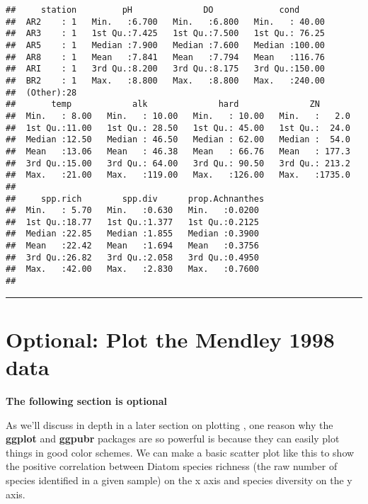 \documentclass[]{book}
\theoremstyle{definition}
\theoremstyle{definition}
\theoremstyle{definition}
\theoremstyle{remark}
\begin{document}
\begin{verbatim}
##     station         pH              DO             cond       
##  AR2    : 1   Min.   :6.700   Min.   :6.800   Min.   : 40.00  
##  AR3    : 1   1st Qu.:7.425   1st Qu.:7.500   1st Qu.: 76.25  
##  AR5    : 1   Median :7.900   Median :7.600   Median :100.00  
##  AR8    : 1   Mean   :7.841   Mean   :7.794   Mean   :116.76  
##  ARI    : 1   3rd Qu.:8.200   3rd Qu.:8.175   3rd Qu.:150.00  
##  BR2    : 1   Max.   :8.800   Max.   :8.800   Max.   :240.00  
##  (Other):28                                                   
##       temp            alk              hard              ZN        
##  Min.   : 8.00   Min.   : 10.00   Min.   : 10.00   Min.   :   2.0  
##  1st Qu.:11.00   1st Qu.: 28.50   1st Qu.: 45.00   1st Qu.:  24.0  
##  Median :12.50   Median : 46.50   Median : 62.00   Median :  54.0  
##  Mean   :13.06   Mean   : 46.38   Mean   : 66.76   Mean   : 177.3  
##  3rd Qu.:15.00   3rd Qu.: 64.00   3rd Qu.: 90.50   3rd Qu.: 213.2  
##  Max.   :21.00   Max.   :119.00   Max.   :126.00   Max.   :1735.0  
##                                                                    
##     spp.rich        spp.div      prop.Achnanthes 
##  Min.   : 5.70   Min.   :0.630   Min.   :0.0200  
##  1st Qu.:18.77   1st Qu.:1.377   1st Qu.:0.2125  
##  Median :22.85   Median :1.855   Median :0.3900  
##  Mean   :22.42   Mean   :1.694   Mean   :0.3756  
##  3rd Qu.:26.82   3rd Qu.:2.058   3rd Qu.:0.4950  
##  Max.   :42.00   Max.   :2.830   Max.   :0.7600  
## 
\end{verbatim}

\begin{center}\rule{0.5\linewidth}{\linethickness}\end{center}

\section{Optional: Plot the Mendley 1998
data}\label{optional-plot-the-mendley-1998-data}

\textbf{The following section is optional}

As we'll discuss in depth in a later section on plotting , one reason
why the \textbf{ggplot} and \textbf{ggpubr} packages are so powerful is
because they can easily plot things in good color schemes. We can make a
basic scatter plot like this to show the positive correlation between
Diatom species richness (the raw number of species identified in a given
sample) on the x axis and species diversity on the y axis.
\end{document}
